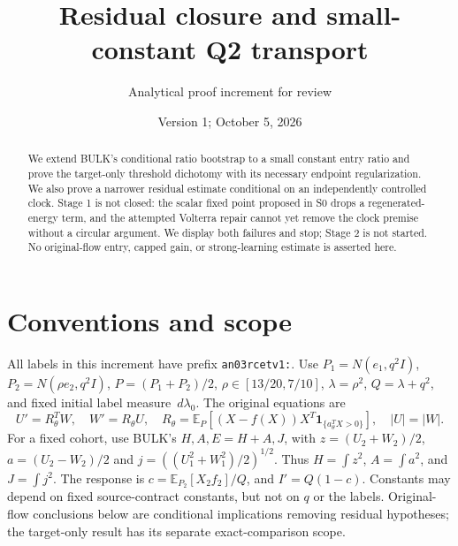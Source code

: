 \documentclass[11pt]{article}
\title{Residual closure and small-constant Q2 transport}
\author{Analytical proof increment for review}
\date{Version 1; October 5, 2026}
\newcommand{\E}{\mathbb E}
\newcommand{\dd}{\,d}
\newcommand{\one}{\mathbf1}
\begin{document}
\maketitle
\begin{abstract}
We extend BULK's conditional ratio bootstrap to a small constant entry
ratio and prove the target-only threshold dichotomy with its necessary
endpoint regularization. We also prove a narrower residual estimate
conditional on an independently controlled clock. Stage 1 is not
closed: the scalar fixed point proposed in S0 drops a regenerated-energy
term, and the attempted Volterra repair cannot yet remove the clock
premise without a circular argument. We display both failures and stop;
Stage 2 is not started. No original-flow entry, capped gain, or
strong-learning estimate is asserted here.
\end{abstract}

\section{Conventions and scope}
All labels in this increment have prefix \texttt{an03rcetv1:}.
Use $P_1=N(e_1,q^2I)$, $P_2=N(\rho e_2,q^2I)$,
$P=(P_1+P_2)/2$, $\rho\in[13/20,7/10]$, $\lambda=\rho^2$,
$Q=\lambda+q^2$, and fixed initial label measure $\dd\lambda_0$.
The original equations are
\[
 U'=R_\theta^TW,\quad W'=R_\theta U,\quad
 R_\theta=\E_P[(X-f(X))X^T\one_{\{a_\theta^TX>0\}}],\quad |U|=|W|.
\]
For a fixed cohort, use BULK's $H,A,E=H+A,J$, with
$z=(U_2+W_2)/2$, $a=(U_2-W_2)/2$ and
$j=((U_1^2+W_1^2)/2)^{1/2}$. Thus $H=\int z^2$,
$A=\int a^2$, and $J=\int j^2$.
The response is $c=\E_{P_2}[X_2f_2]/Q$, and $I'=Q(1-c)$.
Constants may depend on fixed source-contract constants, but not on
$q$ or the labels. Original-flow conclusions below are conditional
implications removing residual hypotheses; the target-only result has
its separate exact-comparison scope.
\end{document}
